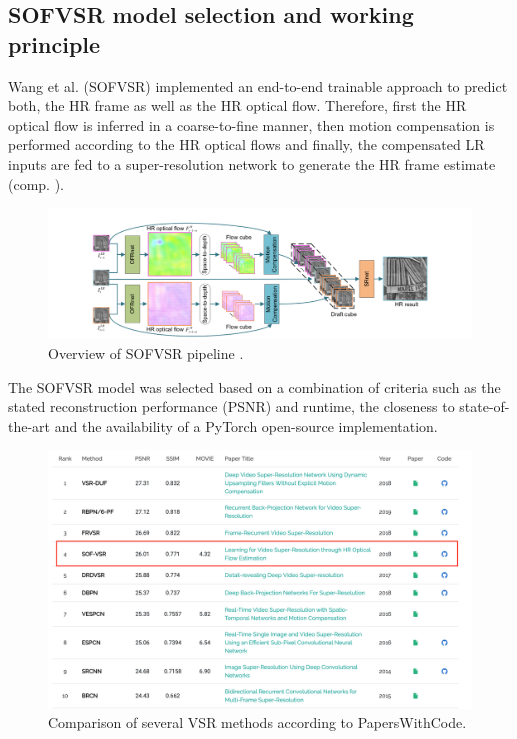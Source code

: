 \subsection*{SOFVSR model selection and working principle}
Wang et al. \cite{LFVSRTHROFE} (SOFVSR) implemented an end-to-end trainable
approach to predict both, the \ac{HR} frame as well as the HR optical flow.
Therefore, first the HR optical flow is inferred in a coarse-to-fine manner,
then motion compensation is performed according to the HR optical flows and
finally, the compensated LR inputs are fed to a super-resolution network to
generate the HR frame estimate (comp. ).

\begin{figure}[!htbp]
	\centering
	\includegraphics[width=14cm]{figures/sofvsr}
	\caption{Overview of SOFVSR pipeline \cite{LFVSRTHROFE}.}
  \label{fig:sofvsr}
\end{figure}

The SOFVSR model was selected based on a combination of criteria such as the
stated reconstruction performance (PSNR) and runtime, the closeness to
state-of-the-art and the availability of a PyTorch open-source implementation.

\begin{figure}[!htbp]
	\centering
	\includegraphics[width=14cm]{figures/sofvsr_selection}
	\caption{Comparison of several \ac{VSR} methods according to PapersWithCode.}
  \label{fig:sofvsr_selection}
\end{figure}


%
